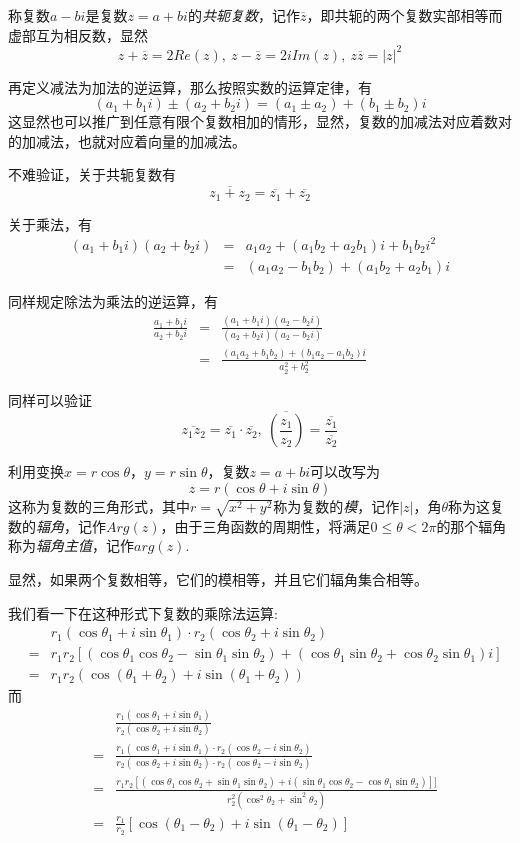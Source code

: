 称复数$a-bi$是复数$z=a+bi$的\emph{共轭复数}，记作$\overline{z}$，即共轭的两个复数实部相等而虚部互为相反数，显然
\[ z+\overline{z}=2Re(z), \  z-\overline{z}=2iIm(z), \  z\overline{z}=|z|^2 \]

再定义减法为加法的逆运算，那么按照实数的运算定律，有
\[ (a_1+b_1i) \pm (a_2+b_2i) = (a_1 \pm a_2) + (b_1 \pm b_2)i \]
这显然也可以推广到任意有限个复数相加的情形，显然，复数的加减法对应着数对的加减法，也就对应着向量的加减法。

不难验证，关于共轭复数有
\[ \overline{z_1+z_2}=\overline{z_1}+\overline{z_2} \]

关于乘法，有
\begin{eqnarray*}
  (a_1+b_1i)(a_2+b_2i) & = & a_1a_2+(a_1b_2+a_2b_1)i + b_1b_2 i^2 \\
  & = & (a_1a_2-b_1b_2) + (a_1b_2+a_2b_1)i
\end{eqnarray*}

同样规定除法为乘法的逆运算，有
\begin{eqnarray*}
  \frac{a_1+b_1i}{a_2+b_2i} & = & \frac{(a_1+b_1i)(a_2-b_2i)}{(a_2+b_2i)(a_2-b_2i)} \\
  & = & \frac{(a_1a_2+b_1b_2)+(b_1a_2-a_1b_2)i}{a_2^2+b_2^2}
\end{eqnarray*}

同样可以验证
\[ \overline{z_1z_2} = \overline{z_1} \cdot \overline{z_2}, \  \overline{\left( \frac{z_1}{z_2} \right)} = \frac{\overline{z_1}}{\overline{z_2}} \]

利用变换$x=r\cos{\theta}$，$y=r\sin{\theta}$，复数$z=a+bi$可以改写为
\[ z=r(\cos{\theta}+i\sin{\theta}) \]
这称为复数的三角形式，其中$r=\sqrt{x^2+y^2}$称为复数的\emph{模}，记作$|z|$，角$\theta$称为这复数的\emph{辐角}，记作$Arg(z)$，由于三角函数的周期性，将满足$0\leqslant \theta < 2\pi$的那个辐角称为\emph{辐角主值}，记作$arg(z)$.

显然，如果两个复数相等，它们的模相等，并且它们辐角集合相等。

我们看一下在这种形式下复数的乘除法运算:
\begin{eqnarray*}
  &&  r_1(\cos{\theta_1}+i\sin{\theta_1}) \cdot r_2(\cos{\theta_2}+i\sin{\theta_2}) \\
  & = & r_1r_2[(\cos{\theta_1}\cos{\theta_2}-\sin{\theta_1}\sin{\theta_2})+(\cos{\theta_1}\sin{\theta_2}+\cos{\theta_2}\sin{\theta_1})i] \\
  & = & r_1r_2(\cos{(\theta_1+\theta_2)}+i\sin{(\theta_1+\theta_2)})
\end{eqnarray*}
而
\begin{eqnarray*}
  &&  \frac{r_1(\cos{\theta_1}+i\sin{\theta_1})}{r_2(\cos{\theta_2}+i\sin{\theta_2})} \\
  & = & \frac{r_1(\cos{\theta_1}+i\sin{\theta_1}) \cdot r_2(\cos{\theta_2}-i\sin{\theta_2})}{r_2(\cos{\theta_2}+i\sin{\theta_2}) \cdot r_2(\cos{\theta_2}-i\sin{\theta_2})} \\
  & = & \frac{r_1r_2[(\cos{\theta_1}\cos{\theta_2}+\sin{\theta_1}\sin{\theta_2})+i(\sin{\theta_1}\cos{\theta_2}-\cos{\theta_1}\sin{\theta_2})]]}{r_2^2(\cos^2{\theta_2}+\sin^2{\theta_2})} \\
  & = & \frac{r_1}{r_2}[\cos{(\theta_1-\theta_2)+i\sin{(\theta_1-\theta_2)}}]
\end{eqnarray*}

